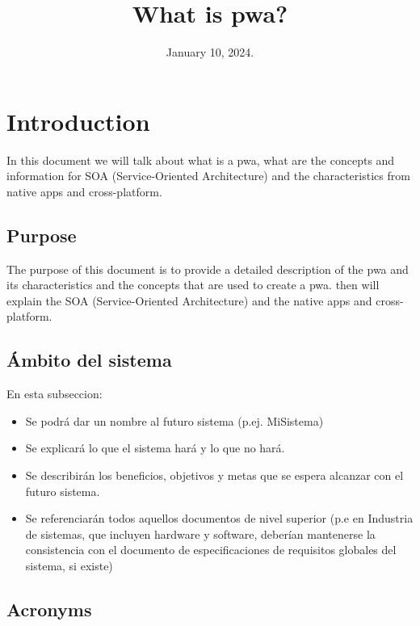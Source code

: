 \documentclass[12pt,a4paper, twosite]{article}
\date{January 10, 2024.}
\title{What is pwa?}
\begin{document}
\maketitle

\newpage
\tableofcontents

\newpage

\section{Introduction}
\label{sec:org60390fa}

In this document we will talk about what is a pwa, what are the concepts and information for SOA (Service-Oriented Architecture) and the characteristics from native apps and cross-platform.


\subsection{Purpose}
\label{sec:org434c3ef}

The purpose of this document is to provide a detailed description of the pwa and its characteristics
and the concepts that are used to create a pwa. then will explain the SOA (Service-Oriented Architecture) and the native apps and cross-platform.

\subsection{Ámbito del sistema}
\label{sec:org12e44a1}

En esta subseccion:

\begin{itemize}
\item Se podrá dar un nombre al futuro sistema (p.ej. MiSistema)

\item Se explicará lo que el sistema hará y lo que no hará.

\item Se describirán los beneficios, objetivos y metas que se espera
alcanzar con el futuro sistema.

\item Se referenciarán todos aquellos documentos de nivel superior (p.e en
Industria de sistemas, que incluyen hardware y software, deberían
mantenerse la consistencia con el documento de especificaciones de
requisitos globales del sistema, si existe)
\end{itemize}


\subsection{Acronyms}
\label{sec:orgb158e36}
\end{document}
